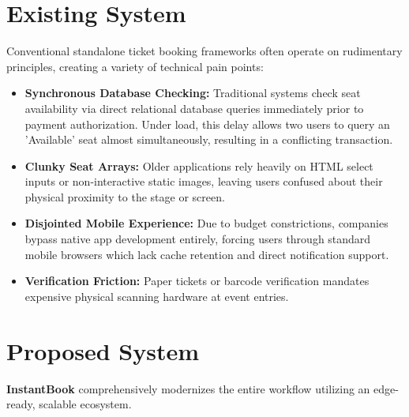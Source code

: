 \documentclass[12pt,a4paper]{report}
\begin{document}
\section{Existing System}

Conventional standalone ticket booking frameworks often operate on rudimentary principles, creating a variety of technical pain points:
\begin{itemize}
    \item \textbf{Synchronous Database Checking:} Traditional systems check seat availability via direct relational database queries immediately prior to payment authorization. Under load, this delay allows two users to query an 'Available' seat almost simultaneously, resulting in a conflicting transaction.
    \item \textbf{Clunky Seat Arrays:} Older applications rely heavily on HTML select inputs or non-interactive static images, leaving users confused about their physical proximity to the stage or screen.
    \item \textbf{Disjointed Mobile Experience:} Due to budget constrictions, companies bypass native app development entirely, forcing users through standard mobile browsers which lack cache retention and direct notification support.
    \item \textbf{Verification Friction:} Paper tickets or barcode verification mandates expensive physical scanning hardware at event entries.
\end{itemize}

\section{Proposed System}

\textbf{InstantBook} comprehensively modernizes the entire workflow utilizing an edge-ready, scalable ecosystem. 
\end{document}
